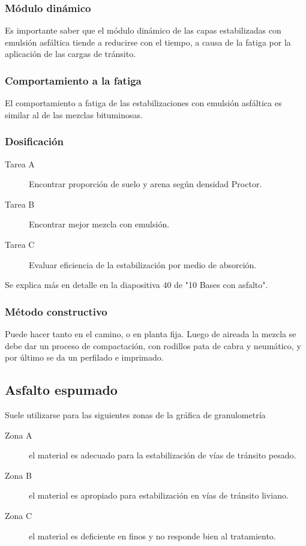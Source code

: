 \documentclass[../main.tex]{subfiles}
\begin{document}
\subsubsection{Módulo dinámico}

Es importante saber que el módulo dinámico de las capas estabilizadas con
emulsión asfáltica tiende a reducirse con el tiempo, a causa de la fatiga por
la aplicación de las cargas de tránsito.

\subsubsection{Comportamiento a la fatiga}

El comportamiento a fatiga de las estabilizaciones con emulsión asfáltica es 
similar al de las mezclas bituminosas.

\subsubsection{Dosificación}

\begin{description}
  \item[Tarea A] Encontrar proporción de suelo y arena según densidad Proctor.
  \item[Tarea B] Encontrar mejor mezcla con emulsión.
  \item[Tarea C] Evaluar eficiencia de la estabilización por medio de absorción.
\end{description}

Se explica más en detalle en la diapositiva 40 de "10 Bases con asfalto".

\subsubsection{Método constructivo}

Puede hacer tanto en el camino, o en planta fija. Luego de aireada la mezcla
 se debe dar un proceso de compactación, con rodillos pata de cabra y neumático,
 y por último se da un perfilado e imprimado.

\subsection{Asfalto espumado}

Suele utilizarse para las siguientes zonas de la gráfica de granulometría

\begin{description}
  \item[Zona A] el material es adecuado para la estabilización de vías de 
    tránsito pesado.
  \item[Zona B] el material es apropiado para estabilización en vías de tránsito
    liviano.
  \item[Zona C] el material es deficiente en finos y no responde bien al 
    tratamiento.
\end{description}
\end{document}
